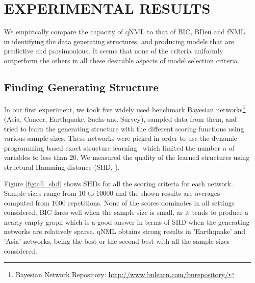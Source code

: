 \section{EXPERIMENTAL RESULTS}

We empirically compare the capacity of qNML to that of BIC, BDeu and
fNML in identifying the data generating structures, and producing
models that are predictive and parsimonious.  It seems that none of
the criteria uniformly outperform the others in all these desirable
aspects of model selection criteria.

\subsection{Finding Generating Structure}

In our first experiment, we took five widely used benchmark Bayesian networks\footnote{Bayesian Network Repository: \url{http://www.bnlearn.com/bnrepository/}} (Asia, Cancer, Earthquake, Sachs and Survey), sampled data from them, and tried to learn the generating structure with the different scoring functions using various sample sizes. These networks were picked in order to use the dynamic programming based exact structure learning~\cite{cosco.uai06} which limited the number $n$ of variables
to less than 20. We measured the quality of the learned structures using structural Hamming distance (SHD, \cite{Tsamardinos2006}). 

Figure \ref{fig:all_shd} shows SHDs for all the scoring criteria for each network. Sample sizes range from $10$ to $10000$ and the shown results are averages computed from $1000$ repetitions. None of the scores dominates in all settings considered. BIC fares well when the sample size is small, as it tends to produce a nearly empty graph which is a good answer in terms of SHD when the generating networks are relatively sparse. qNML obtains strong results in 'Earthquake' and 'Asia' networks, being the best or the second best with all the sample sizes considered.

